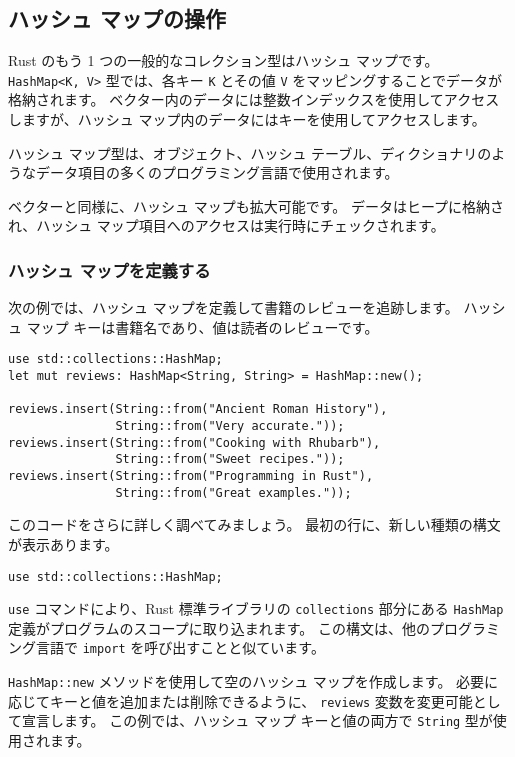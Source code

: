 \subsection{ハッシュ マップの操作}

Rust のもう 1 つの一般的なコレクション型はハッシュ マップです。 \texttt{HashMap<K, V>} 型では、各キー \texttt{K} とその値 \texttt{V} をマッピングすることでデータが格納されます。 ベクター内のデータには整数インデックスを使用してアクセスしますが、ハッシュ マップ内のデータにはキーを使用してアクセスします。

ハッシュ マップ型は、オブジェクト、ハッシュ テーブル、ディクショナリのようなデータ項目の多くのプログラミング言語で使用されます。

ベクターと同様に、ハッシュ マップも拡大可能です。 データはヒープに格納され、ハッシュ マップ項目へのアクセスは実行時にチェックされます。


\subsubsection{ハッシュ マップを定義する}

次の例では、ハッシュ マップを定義して書籍のレビューを追跡します。 ハッシュ マップ キーは書籍名であり、値は読者のレビューです。


\begin{lstlisting}[numbers=none]
use std::collections::HashMap;
let mut reviews: HashMap<String, String> = HashMap::new();

reviews.insert(String::from("Ancient Roman History"), 
               String::from("Very accurate."));
reviews.insert(String::from("Cooking with Rhubarb"),
               String::from("Sweet recipes."));
reviews.insert(String::from("Programming in Rust"),
               String::from("Great examples."));
\end{lstlisting}

このコードをさらに詳しく調べてみましょう。 最初の行に、新しい種類の構文が表示あります。



\begin{lstlisting}[numbers=none]
use std::collections::HashMap;
\end{lstlisting}

\texttt{use} コマンドにより、Rust 標準ライブラリの \texttt{collections} 部分にある \texttt{HashMap} 定義がプログラムのスコープに取り込まれます。 この構文は、他のプログラミング言語で \texttt{import} を呼び出すことと似ています。

\texttt{HashMap::new} メソッドを使用して空のハッシュ マップを作成します。 必要に応じてキーと値を追加または削除できるように、 \texttt{reviews} 変数を変更可能として宣言します。 この例では、ハッシュ マップ キーと値の両方で \texttt{String} 型が使用されます。


